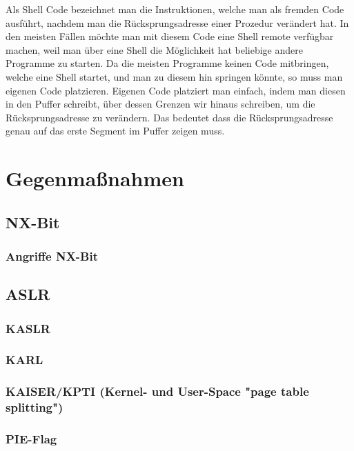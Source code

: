 \documentclass[12pt]{book}
\begin{document}
Als Shell Code bezeichnet man die Instruktionen, welche man als fremden Code
ausführt, nachdem man die Rücksprungsadresse einer Prozedur verändert hat. In
den meisten Fällen möchte man mit diesem Code eine Shell remote verfügbar
machen, weil man über eine Shell die Möglichkeit hat beliebige andere Programme
zu starten. Da die meisten Programme keinen Code mitbringen, welche eine Shell
startet, und man zu diesem hin springen könnte, so muss man eigenen Code
platzieren. Eigenen Code platziert man einfach, indem man diesen in den Puffer
schreibt, über dessen Grenzen wir hinaus schreiben, um die Rücksprungsadresse zu
verändern. Das bedeutet dass die Rücksprungsadresse genau auf das erste Segment
im Puffer zeigen muss.

\chapter{Gegenmaßnahmen}

\section{NX-Bit}

\subsection{Angriffe NX-Bit}

\section{ASLR}

\subsection{KASLR}

\subsection{KARL}

\subsection{KAISER/KPTI (Kernel- und User-Space "page table splitting")}

\subsection{PIE-Flag}
\end{document}
